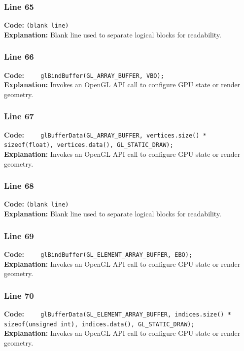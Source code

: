 \documentclass[11pt,a4paper]{article}
\begin{document}
\subsubsection*{Line 65}
\textbf{Code:} \texttt{(blank line)}\\
\textbf{Explanation:} Blank line used to separate logical blocks for readability.

\subsubsection*{Line 66}
\textbf{Code:} \verb|    glBindBuffer(GL_ARRAY_BUFFER, VBO);|\\
\textbf{Explanation:} Invokes an OpenGL API call to configure GPU state or render geometry.

\subsubsection*{Line 67}
\textbf{Code:} \verb|    glBufferData(GL_ARRAY_BUFFER, vertices.size() * sizeof(float), vertices.data(), GL_STATIC_DRAW);|\\
\textbf{Explanation:} Invokes an OpenGL API call to configure GPU state or render geometry.

\subsubsection*{Line 68}
\textbf{Code:} \texttt{(blank line)}\\
\textbf{Explanation:} Blank line used to separate logical blocks for readability.

\subsubsection*{Line 69}
\textbf{Code:} \verb|    glBindBuffer(GL_ELEMENT_ARRAY_BUFFER, EBO);|\\
\textbf{Explanation:} Invokes an OpenGL API call to configure GPU state or render geometry.

\subsubsection*{Line 70}
\textbf{Code:} \verb|    glBufferData(GL_ELEMENT_ARRAY_BUFFER, indices.size() * sizeof(unsigned int), indices.data(), GL_STATIC_DRAW);|\\
\textbf{Explanation:} Invokes an OpenGL API call to configure GPU state or render geometry.
\end{document}
